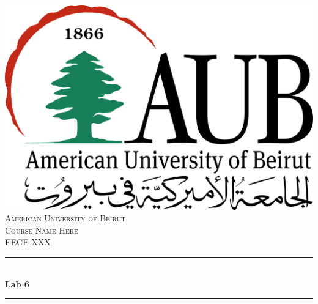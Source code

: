 \documentclass[12pt]{article}
\begin{document}
\begin{titlepage}

\setlength\parindent{0pt}
\newcommand{\HRule}{\rule{\linewidth}{0.5mm}}

\center
 
\includegraphics[scale=0.2]{logo.png}\\[1cm] 
 

\textsc{\LARGE American University of Beirut}\\[1.5cm]
\textsc{\Large Course Name Here}\\[0.5cm] 
\textsc{\large EECE XXX}\\[0.5cm] 


\HRule \\[0.4cm]
{ \huge \bfseries Lab 6}\\[0.4cm]
\HRule \\[1.5cm]
 


\end{titlepage}
\end{document}
